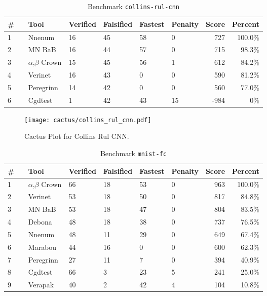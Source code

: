 \begin{table}[h]
\begin{center}
\caption{Benchmark \texttt{collins-rul-cnn}} \label{tab:cat_{cat}}
{\setlength{\tabcolsep}{2pt}
\begin{tabular}[h]{@{}llllllrr@{}}
\toprule
\textbf{\# ~} & \textbf{Tool} & \textbf{Verified} & \textbf{Falsified} & \textbf{Fastest} & \textbf{Penalty} & \textbf{Score} & \textbf{Percent}\\
\midrule
1 & Nnenum & 16 & 45 & 58 & 0 & 727 & 100.0\% \\
2 & MN BaB & 16 & 44 & 57 & 0 & 715 & 98.3\% \\
3 & $\alpha$,$\beta$ Crown & 15 & 45 & 56 & 1 & 612 & 84.2\% \\
4 & Verinet & 16 & 43 & 0 & 0 & 590 & 81.2\% \\
5 & Peregrinn & 14 & 42 & 0 & 0 & 560 & 77.0\% \\
6 & Cgdtest & 1 & 42 & 43 & 15 & -984 & 0\% \\
\bottomrule
\end{tabular}
}
\end{center}
\end{table}



\begin{figure}[h]
\centerline{\texttt{[image: cactus/collins\_rul\_cnn.pdf]}}
\caption{Cactus Plot for Collins Rul CNN.}
\label{fig:quantPic}
\end{figure}



\begin{table}[h]
\begin{center}
\caption{Benchmark \texttt{mnist-fc}} \label{tab:cat_{cat}}
{\setlength{\tabcolsep}{2pt}
\begin{tabular}[h]{@{}llllllrr@{}}
\toprule
\textbf{\# ~} & \textbf{Tool} & \textbf{Verified} & \textbf{Falsified} & \textbf{Fastest} & \textbf{Penalty} & \textbf{Score} & \textbf{Percent}\\
\midrule
1 & $\alpha$,$\beta$ Crown & 66 & 18 & 53 & 0 & 963 & 100.0\% \\
2 & Verinet & 53 & 18 & 50 & 0 & 817 & 84.8\% \\
3 & MN BaB & 53 & 18 & 47 & 0 & 804 & 83.5\% \\
4 & Debona & 48 & 18 & 38 & 0 & 737 & 76.5\% \\
5 & Nnenum & 48 & 11 & 29 & 0 & 649 & 67.4\% \\
6 & Marabou & 44 & 16 & 0 & 0 & 600 & 62.3\% \\
7 & Peregrinn & 27 & 11 & 7 & 0 & 394 & 40.9\% \\
8 & Cgdtest & 66 & 3 & 23 & 5 & 241 & 25.0\% \\
9 & Verapak & 40 & 2 & 42 & 4 & 104 & 10.8\% \\
\bottomrule
\end{tabular}
}
\end{center}
\end{table}



